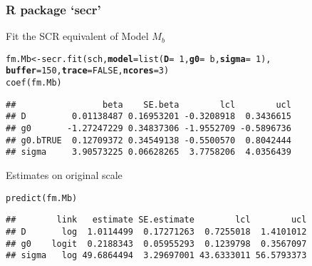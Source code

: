 \documentclass[color=usenames,dvipsnames]{beamer}\usepackage[]{graphicx}\usepackage[]{color}
\makeatletter
\newcommand{\hlnum}[1]{\textcolor[rgb]{0.69,0.494,0}{#1}}%
\newcommand{\hlopt}[1]{\textcolor[rgb]{0,0,0}{#1}}%
\newcommand{\hlstd}[1]{\textcolor[rgb]{0,0,0}{#1}}%
\newcommand{\hlkwb}[1]{\textcolor[rgb]{0,0.341,0.682}{#1}}%
\newcommand{\hlkwc}[1]{\textcolor[rgb]{0,0,0}{\textbf{#1}}}%
\newcommand{\hlkwd}[1]{\textcolor[rgb]{0.004,0.004,0.506}{#1}}%
\newenvironment{kframe}{%
 \def\at@end@of@kframe{}%
 \ifinner\ifhmode%
  \def\at@end@of@kframe{\end{minipage}}%
  \begin{minipage}{\columnwidth}%
 \fi\fi%
 \def\FrameCommand##1{\hskip\@totalleftmargin \hskip-\fboxsep
 \colorbox{shadecolor}{##1}\hskip-\fboxsep
     \hskip-\linewidth \hskip-\@totalleftmargin \hskip\columnwidth}%
 \MakeFramed {\advance\hsize-\width
   \@totalleftmargin\z@ \linewidth\hsize
   \@setminipage}}%
 {\par\unskip\endMakeFramed%
 \at@end@of@kframe}
\newenvironment{knitrout}{}{} %
\makeatother
\begin{document}
\begin{frame}[fragile]
  \frametitle{R package `secr'}
  Fit the SCR equivalent of Model $M_b$
\begin{knitrout}\scriptsize
{}\color{fgcolor}\begin{kframe}
\begin{alltt}
\hlstd{fm.Mb} \hlkwb{<-} \hlkwd{secr.fit}\hlstd{(sch,} \hlkwc{model}\hlstd{=}\hlkwd{list}\hlstd{(}\hlkwc{D}\hlstd{=}\hlopt{~}\hlnum{1}\hlstd{,} \hlkwc{g0}\hlstd{=}\hlopt{~}\hlstd{b,} \hlkwc{sigma}\hlstd{=}\hlopt{~}\hlnum{1}\hlstd{),}
                  \hlkwc{buffer}\hlstd{=}\hlnum{150}\hlstd{,} \hlkwc{trace}\hlstd{=}\hlnum{FALSE}\hlstd{,} \hlkwc{ncores}\hlstd{=}\hlnum{3}\hlstd{)}
\hlkwd{coef}\hlstd{(fm.Mb)}
\end{alltt}
\begin{verbatim}
##                 beta    SE.beta        lcl        ucl
## D         0.01138487 0.16953201 -0.3208918  0.3436615
## g0       -1.27247229 0.34837306 -1.9552709 -0.5896736
## g0.bTRUE  0.12709372 0.34549138 -0.5500570  0.8042444
## sigma     3.90573225 0.06628265  3.7758206  4.0356439
\end{verbatim}
\end{kframe}
\end{knitrout}
\pause
\vfill
Estimates on original scale
\begin{knitrout}\scriptsize
{}\color{fgcolor}\begin{kframe}
\begin{alltt}
\hlkwd{predict}\hlstd{(fm.Mb)}
\end{alltt}
\begin{verbatim}
##        link   estimate SE.estimate        lcl        ucl
## D       log  1.0114499  0.17271263  0.7255018  1.4101012
## g0    logit  0.2188343  0.05955293  0.1239798  0.3567097
## sigma   log 49.6864494  3.29697001 43.6333011 56.5793373
\end{verbatim}
\end{kframe}
\end{knitrout}
\end{frame}
\end{document}
